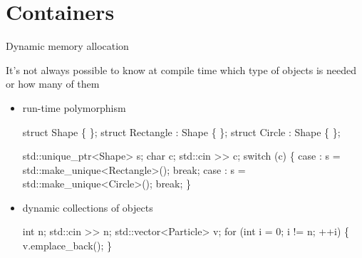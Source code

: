 
\usetikzlibrary{positioning}
\newlength{\bytesize}
\newlength{\memwidth}
\newlength{\memheight}

\section{Containers}

\begin{frame}[fragile]{Dynamic memory allocation}

  It's not always possible to know at compile time which type of objects is
  needed or how many of them
  \begin{itemize}

  \item<2-> run-time polymorphism
    \begin{codeblock}
struct Shape \{ \ddd \};
struct Rectangle : Shape \{ \ddd \};
struct Circle : Shape \{ \ddd \};

std::unique_ptr<Shape> s;
char c; std::cin >{}> c;
switch (c) \{
 case : s = std::make_unique<Rectangle>(); break;
 case : s = std::make_unique<Circle>(); break;
\}\end{codeblock}

  \item<3-> dynamic collections of objects
    \begin{codeblock}
int n; std::cin >{}> n;
std::vector<Particle> v;
for (int i = 0; i != n; ++i) \{
  v.emplace_back(\ddd);
\}\end{codeblock}

  \end{itemize}
\end{frame}

